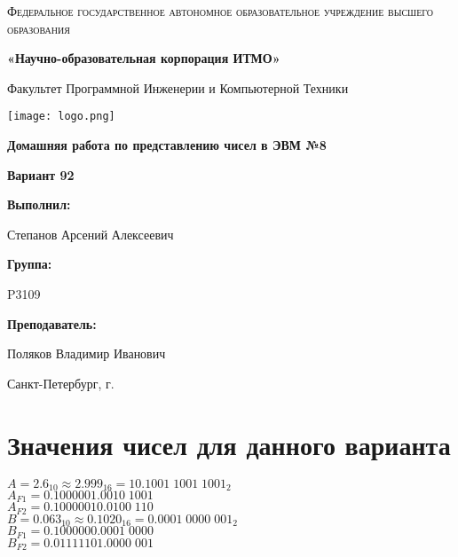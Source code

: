 \documentclass[12pt,a4paper]{report}
\begin{document}
\begin{titlepage}
	\centering
	{
        \scshape
        Федеральное государственное автономное образовательное учреждение высшего образования
        \par
        \textbf{«Научно-образовательная корпорация ИТМО»}
        \par
        \vspace*{1cm}
        Факультет Программной Инженерии и Компьютерной Техники
        \par
    }
    \vspace*{0.6cm}
    \texttt{[image: logo.png]}
    {
        \Large
        \textbf{Домашняя работа по представлению чисел в ЭВМ №8}
        \par
        \normalsize
        \vspace*{0.75cm}
        \textbf{Вариант 92}
        \par
    }
    \vfill
    \hfill\begin{minipage}{\dimexpr\textwidth-7.8cm}
        \textbf{Выполнил:}\par
        Степанов Арсений Алексеевич\par
        \vspace*{0.15cm}
        \textbf{Группа:}\par
        P3109\par
        \vspace*{0.15cm}
        \textbf{Преподаватель:}\par
        Поляков Владимир Иванович\par
    \end{minipage}
    \vfill
    Санкт-Петербург, \the\year{}г.
\end{titlepage}
\section*{Значения чисел для данного варианта}
\onehalfspacing
$A=2.6_{10}\approx2.999_{16}=10.1001\;1001\;1001_2$\\
$A_{F1}=0.1000001.0010\;1001$\\
$A_{F2}=0.10000010.0100\;110$\\
\hfill\break
$B=0.063_{10}\approx0.1020_{16}=0.0001\;0000\;001_2$\\
$B_{F1}=0.1000000.0001\;0000$\\
$B_{F2}=0.01111101.0000\;001$
\end{document}
